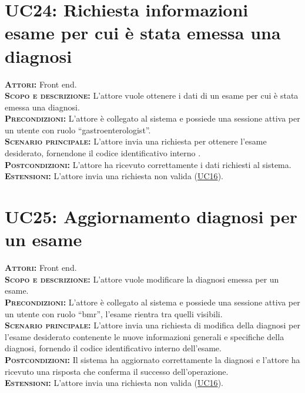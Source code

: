 \section{UC24: Richiesta informazioni esame per cui è stata emessa una diagnosi}
\label{sec:UC24}
\textsc{\textbf{Attori:}} Front end.\\
\textsc{\textbf{Scopo e descrizione:}} L'attore vuole ottenere i dati di un esame per cui è stata emessa una diagnosi.\\
\textsc{\textsc{\textbf{Precondizioni:}}} L'attore è collegato al sistema e possiede una sessione attiva per un utente con ruolo ``gastroenterologist''.\\
\textsc{\textbf{Scenario principale:}}  L'attore invia una richiesta per ottenere l'esame desiderato, fornendone il codice identificativo interno .\\
\textsc{\textbf{Postcondizioni:}} L'attore ha ricevuto correttamente i dati richiesti al sistema.\\
\textsc{\textbf{Estensioni:}} L'attore invia una richiesta non valida (\hyperref[sec:UC16]{UC16}).

\section{UC25: Aggiornamento diagnosi per un esame}
\label{sec:UC25}
\textsc{\textbf{Attori:}} Front end.\\
\textsc{\textbf{Scopo e descrizione:}} L'attore vuole modificare la diagnosi emessa per un esame.\\
\textsc{\textsc{\textbf{Precondizioni:}}} L'attore è collegato al sistema e possiede una sessione attiva per un utente con ruolo ``bmr'', l'esame rientra tra quelli visibili.\\
\textsc{\textbf{Scenario principale:}}  L'attore invia una richiesta di modifica della diagnosi per l'esame desiderato contenente le nuove informazioni generali e specifiche della diagnosi, fornendo il codice identificativo interno dell'esame.\\
\textsc{\textbf{Postcondizioni:}} Il sistema ha aggiornato correttamente la diagnosi e l'attore ha ricevuto una risposta che conferma il successo dell'operazione.\\
\textsc{\textbf{Estensioni:}} L'attore invia una richiesta non valida (\hyperref[sec:UC16]{UC16}).

